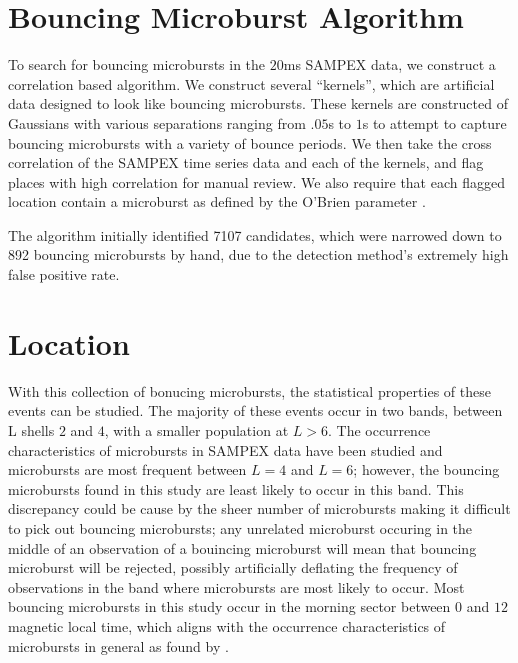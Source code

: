\documentclass[draft]{agujournal2019}
\begin{document}
 
\section{Bouncing Microburst Algorithm}
To search for bouncing microbursts in the $20$ms SAMPEX data, we construct a correlation based algorithm. %
We construct several ``kernels'', which are artificial data designed to look like bouncing microbursts. 
These kernels are constructed of Gaussians with various separations ranging from $.05$s to $1$s to attempt to capture bouncing microbursts with a variety of bounce periods. 
We then take the cross correlation of the SAMPEX time series data and each of the kernels, and flag places with high correlation for manual review. 
We also require that each flagged location contain a microburst as defined by the O'Brien parameter \cite{obrien_parameter}. 

The algorithm initially identified 7107 candidates, which were narrowed down to 892 bouncing microbursts by hand, due to the detection method's extremely high false positive rate.


\section{Location}
With this collection of bonucing microbursts, the statistical properties of these events can be studied. 
The majority of these events occur in two bands, between L shells $2$ and $4$, with a smaller population at $L>6$. 
The occurrence characteristics of microbursts in SAMPEX data have been studied \cite{burst_occurrence} and microbursts are most frequent between $L=4$ and $L=6$; however, the bouncing microbursts found in this study are least likely to occur in this band. 
This discrepancy could be cause by the sheer number of microbursts making it difficult to pick out bouncing microbursts; any unrelated microburst occuring in the middle of an observation of a bouincing microburst will mean that bouncing microburst will be rejected, possibly artificially deflating the frequency of observations in the band where microbursts are most likely to occur. 
Most bouncing microbursts in this study occur in the morning sector between $0$ and $12$ magnetic local time, which aligns with the occurrence characteristics of microbursts in general as found by \cite{burst_occurrence}.
\end{document}

